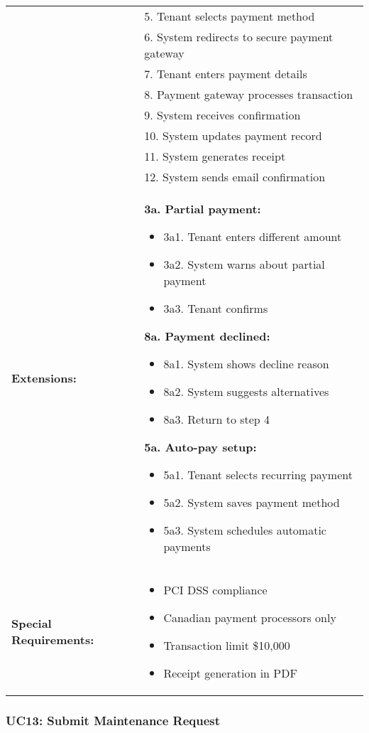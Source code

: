 \documentclass[12pt]{article}
\begin{document}
\begin{tabular}{|p{3cm}|p{11cm}|}
& 5. Tenant selects payment method \\
& 6. System redirects to secure payment gateway \\
& 7. Tenant enters payment details \\
& 8. Payment gateway processes transaction \\
& 9. System receives confirmation \\
& 10. System updates payment record \\
& 11. System generates receipt \\
& 12. System sends email confirmation \\
\hline
\textbf{Extensions:} & 
\textbf{3a. Partial payment:}
\begin{itemize}
    \item 3a1. Tenant enters different amount
    \item 3a2. System warns about partial payment
    \item 3a3. Tenant confirms
\end{itemize}
\textbf{8a. Payment declined:}
\begin{itemize}
    \item 8a1. System shows decline reason
    \item 8a2. System suggests alternatives
    \item 8a3. Return to step 4
\end{itemize}
\textbf{5a. Auto-pay setup:}
\begin{itemize}
    \item 5a1. Tenant selects recurring payment
    \item 5a2. System saves payment method
    \item 5a3. System schedules automatic payments
\end{itemize} \\
\hline
\textbf{Special Requirements:} & 
\begin{itemize}
    \item PCI DSS compliance
    \item Canadian payment processors only
    \item Transaction limit \$10,000
    \item Receipt generation in PDF
\end{itemize} \\
\hline
\end{tabular}

\subsubsection{UC13: Submit Maintenance Request}
\end{document}
